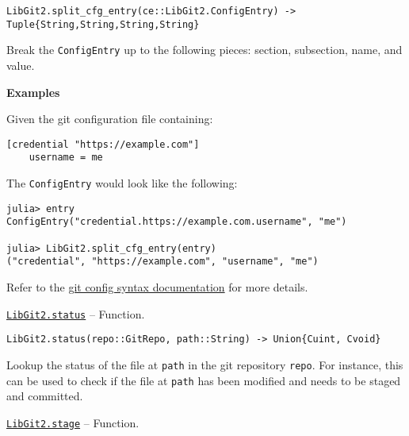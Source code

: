 \begin{adjustwidth}{2em}{0pt}


\begin{verbatim}
LibGit2.split_cfg_entry(ce::LibGit2.ConfigEntry) -> Tuple{String,String,String,String}
\end{verbatim}

Break the \texttt{ConfigEntry} up to the following pieces: section, subsection, name, and value.

\textbf{Examples}

Given the git configuration file containing:


\begin{lstlisting}
[credential "https://example.com"]
    username = me
\end{lstlisting}

The \texttt{ConfigEntry} would look like the following:


\begin{verbatim}
julia> entry
ConfigEntry("credential.https://example.com.username", "me")

julia> LibGit2.split_cfg_entry(entry)
("credential", "https://example.com", "username", "me")
\end{verbatim}

Refer to the \href{https://git-scm.com/docs/git-config\#\_syntax}{git config syntax documentation} for more details.



\end{adjustwidth}
\hypertarget{8948863044724673987}{} 
\hyperlink{8948863044724673987}{\texttt{LibGit2.status}}  -- {Function.}

\begin{adjustwidth}{2em}{0pt}


\begin{verbatim}
LibGit2.status(repo::GitRepo, path::String) -> Union{Cuint, Cvoid}
\end{verbatim}

Lookup the status of the file at \texttt{path} in the git repository \texttt{repo}. For instance, this can be used to check if the file at \texttt{path} has been modified and needs to be staged and committed.



\end{adjustwidth}
\hypertarget{3859390867093299114}{} 
\hyperlink{3859390867093299114}{\texttt{LibGit2.stage}}  -- {Function.}

